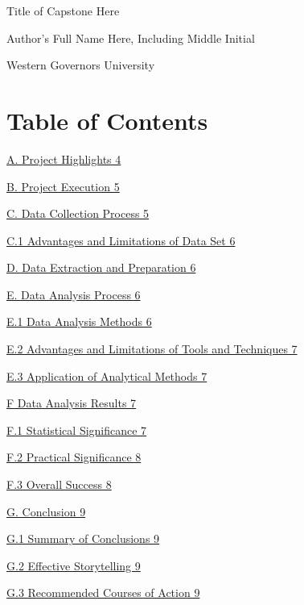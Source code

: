 Title of Capstone Here

Author's Full Name Here, Including Middle Initial

Western Governors University

\textbf{\hfill\break
}

\hypertarget{table-of-contents}{%
\section{Table of Contents}\label{table-of-contents}}

\protect\hyperlink{a.-project-highlights}{A. Project Highlights 4}

\protect\hyperlink{b.-project-execution}{B. Project Execution 5}

\protect\hyperlink{c.-data-collection-process}{C. Data Collection
Process 5}

\protect\hyperlink{c.1-advantages-and-limitations-of-data-set}{C.1
Advantages and Limitations of Data Set 6}

\protect\hyperlink{d.-data-extraction-and-preparation}{D. Data
Extraction and Preparation 6}

\protect\hyperlink{e.-data-analysis-process}{E. Data Analysis Process 6}

\protect\hyperlink{e.1-data-analysis-methods}{E.1 Data Analysis Methods
6}

\protect\hyperlink{e.2-advantages-and-limitations-of-tools-and-techniques}{E.2
Advantages and Limitations of Tools and Techniques 7}

\protect\hyperlink{e.3-application-of-analytical-methods}{E.3
Application of Analytical Methods 7}

\protect\hyperlink{f-data-analysis-results}{F Data Analysis Results 7}

\protect\hyperlink{f.1-statistical-significance}{F.1 Statistical
Significance 7}

\protect\hyperlink{f.2-practical-significance}{F.2 Practical
Significance 8}

\protect\hyperlink{f.3-overall-success}{F.3 Overall Success 8}

\protect\hyperlink{g.-conclusion}{G. Conclusion 9}

\protect\hyperlink{g.1-summary-of-conclusions}{G.1 Summary of
Conclusions 9}

\protect\hyperlink{g.2-effective-storytelling}{G.2 Effective
Storytelling 9}

\protect\hyperlink{g.3-recommended-courses-of-action}{G.3 Recommended
Courses of Action 9}

